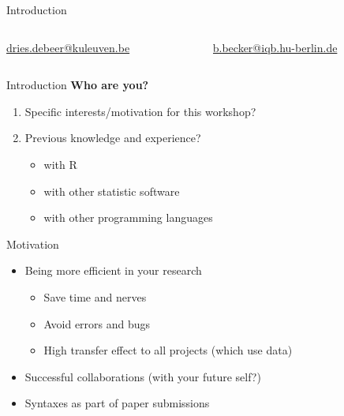 \documentclass{beamer}\usepackage[]{graphicx}\usepackage[]{color}
\begin{document}
\begin{frame}{Introduction}
\vspace{0.5cm}

\begin{columns}[t]
\begin{column}{.475\textwidth}

\href{mailto:dries.debeer@kuleuven.be}{dries.debeer@kuleuven.be}
  	
\end{column}
  \begin{column}{.475\textwidth}

\href{b.becker@iqb.hu-berlin.de}{b.becker@iqb.hu-berlin.de}

  \end{column}
\end{columns}

\vspace{1.5em}
\end{frame}

\begin{frame}{Introduction}
\textbf{Who are you?}
\begin{enumerate}%
	\item Specific interests/motivation for this workshop?
	\item Previous knowledge and experience?
	\begin{itemize}
	  \item with R
	  \item with other statistic software
	  \item with other programming languages
	\end{itemize}
\end{enumerate}
\end{frame}

\begin{frame}{Motivation}
	\begin{itemize}
			\item Being more efficient in your research
			\begin{itemize}
			  \item Save time and nerves
			  \item Avoid errors and bugs
			  \item High transfer effect to all projects (which use data)
			\end{itemize}
			\item Successful collaborations (with your future self?)
			\item Syntaxes as part of paper submissions
	\end{itemize}
\end{frame}
\end{document}
